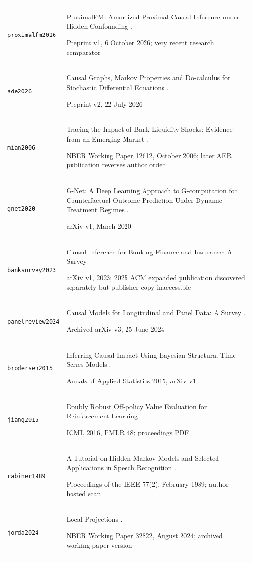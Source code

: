 \begin{longtable}{P{32mm}P{112mm}}
{\scriptsize\texttt{proximalfm2026}} & ProximalFM: Amortized Proximal Causal Inference under Hidden Confounding \citep{proximalfm2026}.\par Preprint v1, 6 October 2026; very recent research comparator\\
{\scriptsize\texttt{sde2026}} & Causal Graphs, Markov Properties and Do-calculus for Stochastic Differential Equations \citep{sde2026}.\par Preprint v2, 22 July 2026\\
{\scriptsize\texttt{mian2006}} & Tracing the Impact of Bank Liquidity Shocks: Evidence from an Emerging Market \citep{mian2006}.\par NBER Working Paper 12612, October 2006; later AER publication reverses author order\\
{\scriptsize\texttt{gnet2020}} & G-Net: A Deep Learning Approach to G-computation for Counterfactual Outcome Prediction Under Dynamic Treatment Regimes \citep{gnet2020}.\par arXiv v1, March 2020\\
{\scriptsize\texttt{banksurvey2023}} & Causal Inference for Banking Finance and Insurance: A Survey \citep{banksurvey2023}.\par arXiv v1, 2023; 2025 ACM expanded publication discovered separately but publisher copy inaccessible\\
{\scriptsize\texttt{panelreview2024}} & Causal Models for Longitudinal and Panel Data: A Survey \citep{panelreview2024}.\par Archived arXiv v3, 25 June 2024\\
{\scriptsize\texttt{brodersen2015}} & Inferring Causal Impact Using Bayesian Structural Time-Series Models \citep{brodersen2015}.\par Annals of Applied Statistics 2015; arXiv v1\\
{\scriptsize\texttt{jiang2016}} & Doubly Robust Off-policy Value Evaluation for Reinforcement Learning \citep{jiang2016}.\par ICML 2016, PMLR 48; proceedings PDF\\
{\scriptsize\texttt{rabiner1989}} & A Tutorial on Hidden Markov Models and Selected Applications in Speech Recognition \citep{rabiner1989}.\par Proceedings of the IEEE 77(2), February 1989; author-hosted scan\\
{\scriptsize\texttt{jorda2024}} & Local Projections \citep{jorda2024}.\par NBER Working Paper 32822, August 2024; archived working-paper version\\

\end{longtable}
